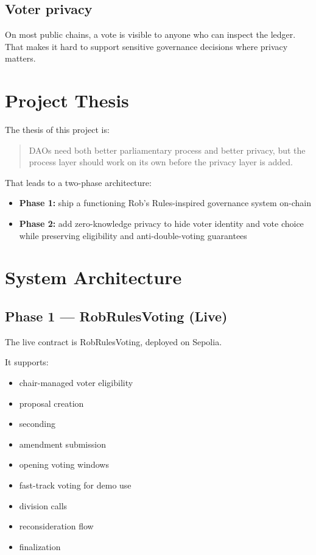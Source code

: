 \documentclass[12pt]{article}
\begin{document}
\subsection{Voter privacy}
On most public chains, a vote is visible to anyone who can inspect the ledger. That makes it hard to support sensitive governance decisions where privacy matters.

\section{Project Thesis}

The thesis of this project is:

\begin{quote}
DAOs need both better parliamentary process and better privacy, but the process layer should work on its own before the privacy layer is added.
\end{quote}

That leads to a two-phase architecture:
\begin{itemize}
    \item \textbf{Phase 1:} ship a functioning Rob's Rules-inspired governance system on-chain
    \item \textbf{Phase 2:} add zero-knowledge privacy to hide voter identity and vote choice while preserving eligibility and anti-double-voting guarantees
\end{itemize}

\section{System Architecture}

\subsection{Phase 1 --- RobRulesVoting (Live)}

The live contract is RobRulesVoting, deployed on Sepolia.

It supports:
\begin{itemize}
    \item chair-managed voter eligibility
    \item proposal creation
    \item seconding
    \item amendment submission
    \item opening voting windows
    \item fast-track voting for demo use
    \item division calls
    \item reconsideration flow
    \item finalization
\end{itemize}
\end{document}
